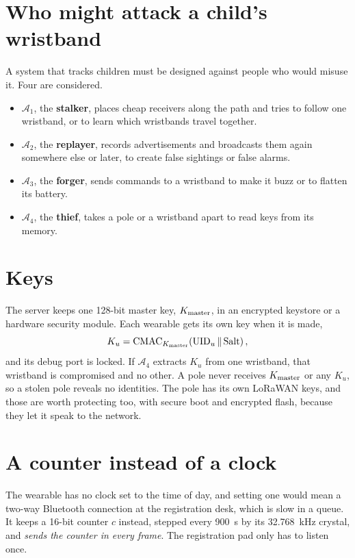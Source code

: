 \documentclass[11pt,a4paper,twoside,openany]{book}
\begin{document}
\section{Who might attack a child's wristband}
A system that tracks children must be designed against people who would misuse it. Four are considered.
\begin{itemize}
\item $\mathcal A_1$, the \textbf{stalker}, places cheap receivers along the path and tries to follow one wristband, or
to learn which wristbands travel together.
\item $\mathcal A_2$, the \textbf{replayer}, records advertisements and broadcasts them again somewhere else or later,
to create false sightings or false alarms.
\item $\mathcal A_3$, the \textbf{forger}, sends commands to a wristband to make it buzz or to flatten its battery.
\item $\mathcal A_4$, the \textbf{thief}, takes a pole or a wristband apart to read keys from its memory.
\end{itemize}

\section{Keys}
The server keeps one 128-bit master key, $K_{\mathrm{master}}$, in an encrypted keystore or a hardware security module. Each
wearable gets its own key when it is made,
\begin{equation}K_u=\operatorname{CMAC}_{K_{\mathrm{master}}}\!\left(\mathrm{UID}_u\,\|\,\mathrm{Salt}\right),\end{equation}
and its debug port is locked. If $\mathcal A_4$ extracts $K_u$ from one wristband, that wristband is compromised and
no other. A pole never receives $K_{\mathrm{master}}$ or any $K_u$, so a stolen pole reveals no identities. The pole has its own
LoRaWAN keys, and those are worth protecting too, with secure boot and encrypted flash, because they let it speak to
the network.

\section{A counter instead of a clock}
The wearable has no clock set to the time of day, and setting one would mean a two-way Bluetooth connection at the
registration desk, which is slow in a queue. It keeps a 16-bit counter $c$ instead, stepped every 900~s by its
32.768~kHz crystal, and \emph{sends the counter in every frame}. The registration pad only has to listen once.
\end{document}
